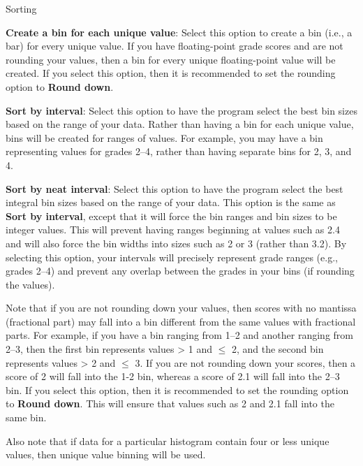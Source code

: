 \documentclass[
]{book}
\newenvironment{optionssection}
    {
    \begin{tcolorbox}[colframe=lightgray,colback=ultralightgray,sharp corners=all,parbox=false]
    }
    {
    \end{tcolorbox}
    }
\newenvironment{optionssectiontitle}
    {
    \begin{tcolorbox}[colframe=lightgray,colback=lightgray]
    \bfseries
    }
    {
    \end{tcolorbox}
    }
\theoremstyle{definition}
\theoremstyle{definition}
\theoremstyle{definition}
\theoremstyle{definition}
\theoremstyle{remark}
\begin{document}
\begin{optionssection}

\begin{optionssectiontitle}
Sorting

\end{optionssectiontitle}

\textbf{Create a bin for each unique value}: Select this option to create a bin (i.e., a bar) for every unique value. If you have floating-point grade scores and are not rounding your values, then a bin for every unique floating-point value will be created. If you select this option, then it is recommended to set the rounding option to \textbf{Round down}.

\textbf{Sort by interval}: Select this option to have the program select the best bin sizes based on the range of your data. Rather than having a bin for each unique value, bins will be created for ranges of values. For example, you may have a bin representing values for grades 2--4, rather than having separate bins for 2, 3, and 4.

\textbf{Sort by neat interval}: Select this option to have the program select the best integral bin sizes based on the range of your data. This option is the same as \textbf{Sort by interval}, except that it will force the bin ranges and bin sizes to be integer values. This will prevent having ranges beginning at values such as 2.4 and will also force the bin widths into sizes such as 2 or 3 (rather than 3.2). By selecting this option, your intervals will precisely represent grade ranges (e.g., grades 2--4) and prevent any overlap between the grades in your bins (if rounding the values).

Note that if you are not rounding down your values, then scores with no mantissa (fractional part) may fall into a bin different from the same values with fractional parts. For example, if you have a bin ranging from 1--2 and another ranging from 2--3, then the first bin represents values \textgreater{} 1 and \(\leq\) 2, and the second bin represents values \textgreater{} 2 and \(\leq\) 3. If you are not rounding down your scores, then a score of 2 will fall into the 1-2 bin, whereas a score of 2.1 will fall into the 2--3 bin. If you select this option, then it is recommended to set the rounding option to \textbf{Round down}. This will ensure that values such as 2 and 2.1 fall into the same bin.

Also note that if data for a particular histogram contain four or less unique values, then unique value binning will be used.

\end{optionssection}
\end{document}
